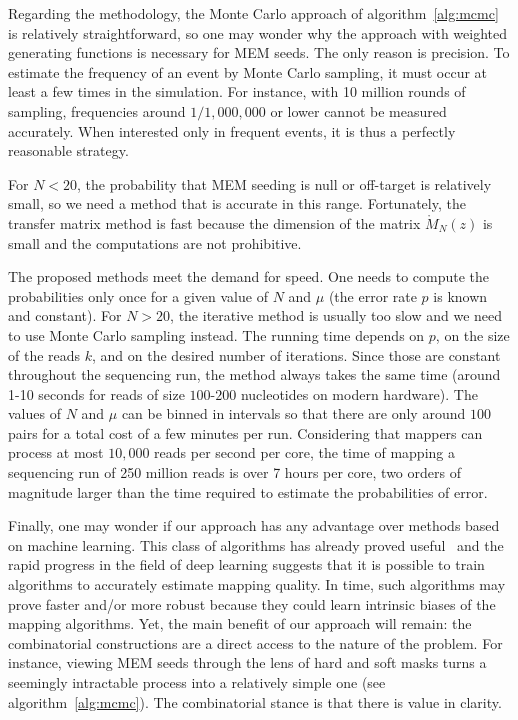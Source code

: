 \documentclass{article}
\begin{document}
Regarding the methodology, the Monte Carlo approach of
algorithm~\ref{alg:mcmc} is relatively straightforward, so one may wonder
why the approach with weighted generating functions is necessary for MEM
seeds. The only reason is precision. To estimate the frequency of an event
by Monte Carlo sampling, it must occur at least a few times in the
simulation. For instance, with 10 million rounds of sampling, frequencies
around $1/1,000,000$ or lower cannot be measured accurately. When
interested only in frequent events, it is thus a perfectly reasonable
strategy.

For $N < 20$, the probability that MEM seeding is null or off-target is
relatively small, so we need a method that is accurate in this range.
Fortunately, the transfer matrix method is fast because the dimension of
the matrix $\mathring{M}_N(z)$ is small and the computations are not
prohibitive.

The proposed methods meet the demand for speed. One needs to compute the
probabilities only once for a given value of $N$ and $\mu$ (the error rate
$p$ is known and constant). For $N > 20$, the iterative method is usually
too slow and we need to use Monte Carlo sampling instead. The running
time depends on $p$, on the size of the reads $k$, and on the desired
number of iterations. Since those are constant throughout the sequencing
run, the method always takes the same time (around 1-10 seconds for reads
of size $100$-$200$ nucleotides on modern hardware). The values of $N$ and
$\mu$ can be binned in intervals so that there are only around $100$ pairs
for a total cost of a few minutes per run. Considering that mappers can
process at most $10,000$ reads per second per core, the time of mapping a
sequencing run of 250 million reads is over 7 hours per core, two orders
of magnitude larger than the time required to estimate the probabilities
of error.

Finally, one may wonder if our approach has any advantage over methods
based on machine learning. This class of algorithms has already proved
useful~\cite{lee2014mosaik} and the rapid progress in the field of deep
learning suggests that it is possible to train algorithms to accurately
estimate mapping quality. In time, such algorithms may prove faster and/or
more robust because they could learn intrinsic biases of the mapping
algorithms. Yet, the main benefit of our approach will remain: the
combinatorial constructions are a direct access to the nature of the
problem. For instance, viewing MEM seeds through the lens of hard and soft
masks turns a seemingly intractable process into a relatively simple one
(see algorithm~\ref{alg:mcmc}). The combinatorial stance is that there is
value in clarity.
\end{document}
